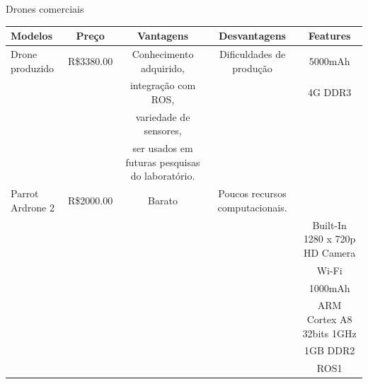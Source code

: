 \begin{frame}[t]{Drones comerciais}
  \transdissolve[duration=0.5]

  \centering

\begin{tabular}{ l|c|c|c|c}
  \textbf{Modelos}      & \textbf{Preço} &               \textbf{Vantagens}                &      \textbf{Desvantagens}      &       \textbf{Features}        \\ \hline
  Drone produzido       &   R\$3380.00   &             Conhecimento adquirido,             &    Dificuldades de produção     &            5000mAh             \\
                        &                &               integração com ROS,               &                                 &            4G DDR3             \\
                        &                &             variedade de sensores,              &                                 &                                \\
                        &                & ser usados em futuras pesquisas do laboratório. &                                 &                                \\ \hline
  Parrot Ardrone 2      &   R\$2000.00   &                     Barato                      & Poucos recursos computacionais. &                                \\
                        &                &                                                 &                                 & Built-In 1280 x 720p HD Camera \\
                        &                &                                                 &                                 &             Wi-Fi              \\
                        &                &                                                 &                                 &            1000mAh             \\
                        &                &                                                 &                                 &   ARM Cortex A8 32bits 1GHz    \\
                        &                &                                                 &                                 &            1GB DDR2            \\
                        &                &                                                 &                                 &              ROS1              \\
\end{tabular}


\end{frame}